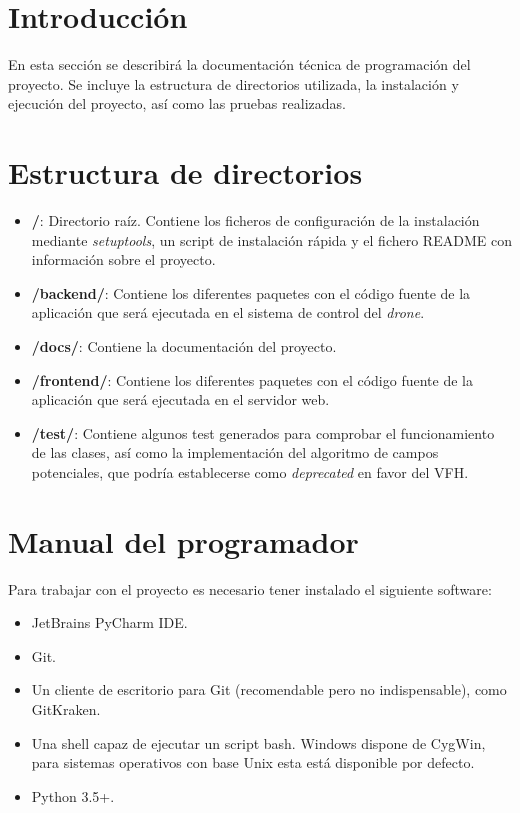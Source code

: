 
\section{Introducción}

En esta sección se describirá la documentación técnica de programación del proyecto. Se incluye la estructura de directorios utilizada, la instalación y ejecución del proyecto, así como las pruebas realizadas.

\section{Estructura de directorios}
\begin{itemize}
\item \textbf{/}: Directorio raíz. Contiene los ficheros de configuración de la instalación mediante \emph{setuptools}, un script de instalación rápida y el fichero README con información sobre el proyecto.
\item \textbf{/backend/}: Contiene los diferentes paquetes con el código fuente de la aplicación que será ejecutada en el sistema de control del \emph{drone}.
\item \textbf{/docs/}: Contiene la documentación del proyecto.
\item \textbf{/frontend/}: Contiene los diferentes paquetes con el código fuente de la aplicación que será ejecutada en el servidor web.
\item \textbf{/test/}: Contiene algunos test generados para comprobar el funcionamiento de las clases, así como la implementación del algoritmo de campos potenciales, que podría establecerse como \emph{deprecated} en favor del VFH.
\end{itemize}


\section{Manual del programador}
Para trabajar con el proyecto es necesario tener instalado el siguiente software:

\begin{itemize}
\item JetBrains PyCharm IDE.
\item Git.
\item Un cliente de escritorio para Git (recomendable pero no indispensable), como GitKraken.
\item Una shell capaz de ejecutar un script bash. Windows dispone de CygWin, para sistemas operativos con base Unix esta está disponible por defecto. 
\item Python 3.5+.
\end{itemize}

